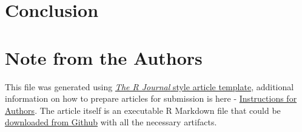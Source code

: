 \hypertarget{conclusion}{%
\section{Conclusion}\label{conclusion}}



\hypertarget{note-from-the-authors}{%
\section{Note from the Authors}\label{note-from-the-authors}}

This file was generated using
\href{https://github.com/rstudio/rticles}{\emph{The R Journal} style
article template}, additional information on how to prepare articles for
submission is here -
\href{https://journal.r-project.org/share/author-guide.pdf}{Instructions
for Authors}. The article itself is an executable R Markdown file that
could be
\href{https://github.com/ivbsoftware/big-data-final-2/blob/master/docs/R_Journal/big-data-final-2/}{downloaded
from Github} with all the necessary artifacts.


\address{%
Vadim Spirkov\\
York University School of Continuing Studies\\
\\
}


\address{%
Murlidhar Loka\\
York University School of Continuing Studies\\
\\
}


